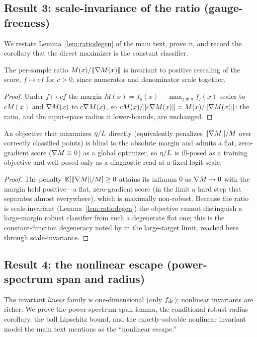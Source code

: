 \subsection{Result 3: scale-invariance of the ratio (gauge-freeness)}
\label{app:ft-scale}
We restate Lemma~\ref{lem:ratiodegen} of the main text, prove it, and record the
corollary that the direct maximizer is the constant classifier.

\begin{lemma}\label{lem:ratiodegen}
The per-sample ratio $M(x)/\lVert\nabla M(x)\rVert$ is invariant to positive
rescaling of the score, $f\mapsto cf$ for $c>0$, since numerator and denominator
scale together.
\end{lemma}
\begin{proof}
Under $f\mapsto cf$ the margin $M(x)=f_y(x)-\max_{j\neq y}f_j(x)$ scales to
$cM(x)$ and $\nabla M(x)$ to $c\nabla M(x)$, so
$cM(x)/\lVert c\nabla M(x)\rVert=M(x)/\lVert\nabla M(x)\rVert$: the ratio, and the
input-space radius it lower-bounds, are unchanged.
\end{proof}

\begin{corollary}\label{cor:ratiodegen-app}
An objective that maximizes $\eta/L$ directly (equivalently penalizes
$\lVert\nabla M\rVert/M$ over correctly classified points) is blind to the
absolute margin and admits a flat, zero-gradient score ($\nabla M\equiv0$) as a
global optimizer, so $\eta/L$ is ill-posed as a training objective and well-posed
only as a diagnostic read at a fixed logit scale.
\end{corollary}
\begin{proof}
The penalty $\mathbb{E}[\lVert\nabla M\rVert/M]\ge0$ attains its infimum $0$ as
$\nabla M\to0$ with the margin held positive---a flat, zero-gradient score (in the
limit a hard step that separates almost everywhere), which is maximally
non-robust. Because the ratio is scale-invariant (Lemma~\ref{lem:ratiodegen}) the
objective cannot distinguish a large-margin robust classifier from such a
degenerate flat one; this is the constant-function degeneracy noted by
\citet{tsuzuku2018lipschitz} in the large-target limit, reached here through
scale-invariance.
\end{proof}

\subsection{Result 4: the nonlinear escape (power-spectrum span and radius)}
\label{app:ft-ps}
The invariant \emph{linear} family is one-dimensional (only $f_{\mathrm{dc}}$); nonlinear
invariants are richer. We prove the power-spectrum span lemma, the conditional
robust-radius corollary, the ball Lipschitz bound, and the exactly-solvable
nonlinear invariant model the main text mentions as the ``nonlinear escape.''

